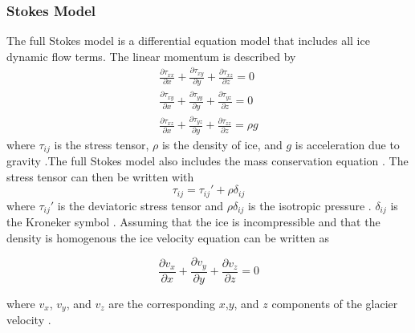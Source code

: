 \documentclass{article}
\begin{document}
\subsubsection{Stokes Model}
The full Stokes model is a differential equation model that includes all ice dynamic flow terms. The linear momentum is described by
\begin{subequations}\label{Stokes}
\begin{gather}
    \frac{\partial \tau_{xx}}{\partial x} + \frac{\partial \tau_{xy}}{\partial y}+ \frac{\partial \tau_{xz}}{\partial z} = 0\\
    \frac{\partial \tau_{xy}}{\partial x} + \frac{\partial \tau_{yy}}{\partial y}+ \frac{\partial \tau_{yz}}{\partial z} = 0\\
    \frac{\partial \tau_{xz}}{\partial x} + \frac{\partial \tau_{yz}}{\partial y}+ \frac{\partial \tau_{zz}}{\partial z} = \rho g
\end{gather}
\end{subequations}
where $\tau_{ij}$ is the stress tensor, $\rho$ is the density of ice, and $g$ is acceleration due to gravity \citep{LEMEUR2004}.The full Stokes model also includes the mass conservation equation \citep{LEMEUR2004}. The stress tensor can then be written with
\begin{equation}
    \tau_{ij} = \tau_{ij}' + \rho \delta_{ij}
\end{equation}
where $\tau_{ij}'$ is the deviatoric stress tensor and $\rho\delta_{ij}$ is the isotropic pressure \citep{LEMEUR2004, soucek2008}. $\delta_{ij}$ is the Kroneker symbol \cite{LEMEUR2004}. Assuming that the ice is incompressible and that the density is homogenous the ice velocity equation can be written as

\begin{equation} \label{mass conservation}
\frac{\partial v_x}{\partial x} + \frac{\partial v_y}{\partial y}  +\frac{\partial v_z}{\partial z} =0   
\end{equation}

where $v_x$, $v_y$, and $v_z$ are the corresponding $x$,$y$, and $z$ components of the glacier velocity \citep{LEMEUR2004,soucek2008}. 
\end{document}
